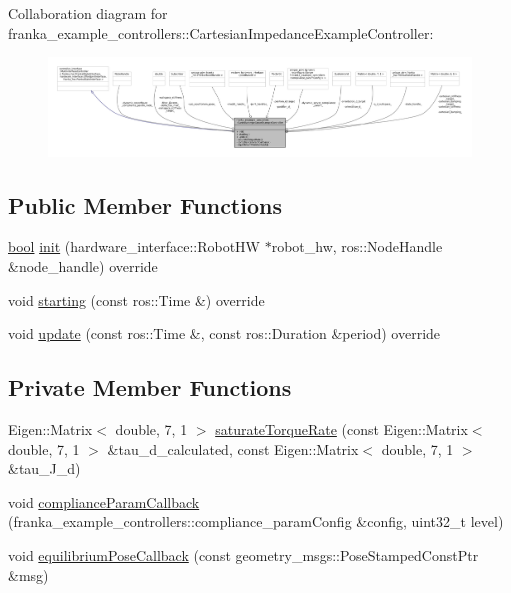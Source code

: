 Collaboration diagram for franka\+\_\+example\+\_\+controllers\+:\+:Cartesian\+Impedance\+Example\+Controller\+:
\nopagebreak
\begin{figure}[H]
\begin{center}
\leavevmode
\includegraphics[width=350pt]{classfranka__example__controllers_1_1CartesianImpedanceExampleController__coll__graph}
\end{center}
\end{figure}
\subsection*{Public Member Functions}
\begin{DoxyCompactItemize}
\item 
\hyperlink{classbool}{bool} \hyperlink{classfranka__example__controllers_1_1CartesianImpedanceExampleController_aa61fee8f409bbfda931c202123dbd7f5}{init} (hardware\+\_\+interface\+::\+Robot\+HW $\ast$robot\+\_\+hw, ros\+::\+Node\+Handle \&node\+\_\+handle) override
\item 
void \hyperlink{classfranka__example__controllers_1_1CartesianImpedanceExampleController_a9191e1f9d60551294d1f225af39f7926}{starting} (const ros\+::\+Time \&) override
\item 
void \hyperlink{classfranka__example__controllers_1_1CartesianImpedanceExampleController_ab7e3690c65dbf1ff57a5d37cb651cd04}{update} (const ros\+::\+Time \&, const ros\+::\+Duration \&period) override
\end{DoxyCompactItemize}
\subsection*{Private Member Functions}
\begin{DoxyCompactItemize}
\item 
Eigen\+::\+Matrix$<$ double, 7, 1 $>$ \hyperlink{classfranka__example__controllers_1_1CartesianImpedanceExampleController_a1a3dd73a99d2686af41ff8c5ff8f216c}{saturate\+Torque\+Rate} (const Eigen\+::\+Matrix$<$ double, 7, 1 $>$ \&tau\+\_\+d\+\_\+calculated, const Eigen\+::\+Matrix$<$ double, 7, 1 $>$ \&tau\+\_\+\+J\+\_\+d)
\item 
void \hyperlink{classfranka__example__controllers_1_1CartesianImpedanceExampleController_a31f27ea8c8f60f073fb50c78cf48ab6c}{compliance\+Param\+Callback} (franka\+\_\+example\+\_\+controllers\+::compliance\+\_\+param\+Config \&config, uint32\+\_\+t level)
\item 
void \hyperlink{classfranka__example__controllers_1_1CartesianImpedanceExampleController_a84a8c0fb5fbb0c273910d1af68fabe0b}{equilibrium\+Pose\+Callback} (const geometry\+\_\+msgs\+::\+Pose\+Stamped\+Const\+Ptr \&msg)
\end{DoxyCompactItemize}
